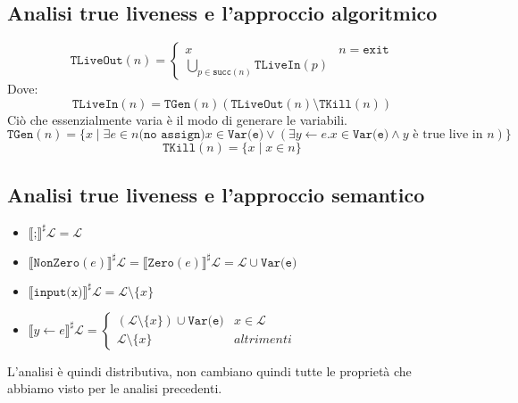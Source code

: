 \subsection{Analisi true liveness e l'approccio algoritmico}
\begin{equation}
    \texttt{TLiveOut}(n) =
        \begin{cases}
            x & n = \texttt{exit}\\
            \bigcup_{p \in \texttt{succ}(n)} \texttt{TLiveIn}(p)
        \end{cases}
\end{equation}
Dove:
\begin{equation}
    \texttt{TLiveIn}(n) = \texttt{TGen}(n) ( \texttt{TLiveOut}(n) \setminus \texttt{TKill}(n))
\end{equation}
Ciò che essenzialmente varia è il modo di generare le variabili.
\begin{equation}
    \texttt{TGen}(n) = \{x \mid \exists e \in n \texttt{(no assign)} x \in \texttt{Var(e)} \lor 
    (\exists y \gets e . x \in \texttt{Var(e)} \land y\text{ è true live in }n)\}
\end{equation}
\begin{equation}
    \texttt{TKill}(n) = \{x \mid x \in n\}
\end{equation}
\subsection{Analisi true liveness e l'approccio semantico}
\begin{itemize}
    \item $\llbracket\texttt{;} \rrbracket^\sharp \mathcal{L} = \mathcal{L}$
    \item $\llbracket \texttt{NonZero}(e) \rrbracket^\sharp \mathcal{L} = 
    \llbracket \texttt{Zero}(e) \rrbracket^\sharp \mathcal{L}
    = \mathcal{L} \cup \texttt{Var(e)}$
    \item $\llbracket \texttt{input(x)} \rrbracket^\sharp \mathcal{L} =
    \mathcal{L} \setminus \{x\}$
    \item $\llbracket y \gets e \rrbracket^\sharp \mathcal{L} = 
    \begin{cases}
        (\mathcal{L} \setminus \{x\}) \cup \texttt{Var(e)} & x \in \mathcal{L}\\
        \mathcal{L} \setminus \{x\} & \textit{altrimenti}
    \end{cases}
    $
\end{itemize}
L'analisi è quindi distributiva, non cambiano quindi tutte le proprietà 
che abbiamo visto per le analisi precedenti.
